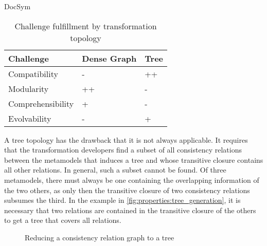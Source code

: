 \begin{copiedFrom}{DocSym}
\begin{table}
    \centering
    \begin{tabular} {L{8em} C{6em} C{5em}}
        \toprule
        \textbf{Challenge} & \textbf{Dense Graph} & \textbf{Tree}\\
        \midrule
        Compatibility & - & ++\\
        Modularity & ++ & -\\
        Comprehensibility & + & -\\
        Evolvability & - & +\\
        \bottomrule
    \end{tabular}
    \caption{Challenge fulfillment by transformation topology}
    \label{tab:properties:topology_impact}
    \vspace{-1.5em}
\end{table}

A tree topology has the drawback that it is not always applicable.
It requires that the transformation developers
find a subset of all consistency relations between the metamodels that induces a tree and whose transitive closure contains all other relations.
In general, such a subset cannot be found.
Of three metamodels, there must always be one containing the overlapping information of the two others, as only then the transitive closure of two consistency relations subsumes the third. 
In the example in \autoref{fig:properties:tree_generation}, it is necessary that two relations are contained in the transitive closure of the others to get a tree that covers all relations.

\begin{figure}[b]
    \centering
    
    \caption{Reducing a consistency relation graph to a tree}
    \label{fig:properties:tree_generation}
\end{figure}


\end{copiedFrom}
